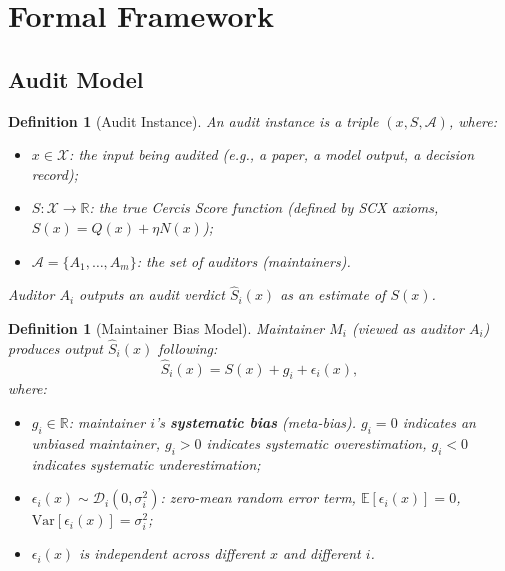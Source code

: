 \documentclass[11pt,a4paper]{article}
\newtheorem{definition}[theorem]{Definition}
\theoremstyle{definition}
\newcommand{\R}{\mathbb{R}}
\newcommand{\E}{\mathbb{E}}
\newcommand{\Var}{\mathrm{Var}}
\begin{document}
\section{Formal Framework}

\subsection{Audit Model}

\begin{definition}[Audit Instance]
\label{def:audit_instance}
An audit instance is a triple $(x, S, \mathcal{A})$, where:
\begin{itemize}
    \item $x \in \mathcal{X}$: the input being audited (e.g., a paper, a model output, a decision record);
    \item $S: \mathcal{X} \to \R$: the true Cercis Score function (defined by SCX axioms, $S(x) = Q(x) + \eta N(x)$);
    \item $\mathcal{A} = \{A_1, \ldots, A_m\}$: the set of auditors (maintainers).
\end{itemize}
Auditor $A_i$ outputs an audit verdict $\hat{S}_i(x)$ as an estimate of $S(x)$.
\end{definition}

\begin{definition}[Maintainer Bias Model]
\label{def:maintainer_bias}
Maintainer $M_i$ (viewed as auditor $A_i$) produces output $\hat{S}_i(x)$ following:
\begin{equation}\label{eq:bias_model}
    \hat{S}_i(x) = S(x) + g_i + \epsilon_i(x),
\end{equation}
where:
\begin{itemize}
    \item $g_i \in \R$: maintainer $i$'s \textbf{systematic bias} (meta-bias). $g_i = 0$ indicates an unbiased maintainer, $g_i > 0$ indicates systematic overestimation, $g_i < 0$ indicates systematic underestimation;
    \item $\epsilon_i(x) \sim \mathcal{D}_i(0, \sigma_i^2)$: zero-mean random error term, $\E[\epsilon_i(x)] = 0$, $\Var[\epsilon_i(x)] = \sigma_i^2$;
    \item $\epsilon_i(x)$ is independent across different $x$ and different $i$.
\end{itemize}
\end{definition}
\end{document}
